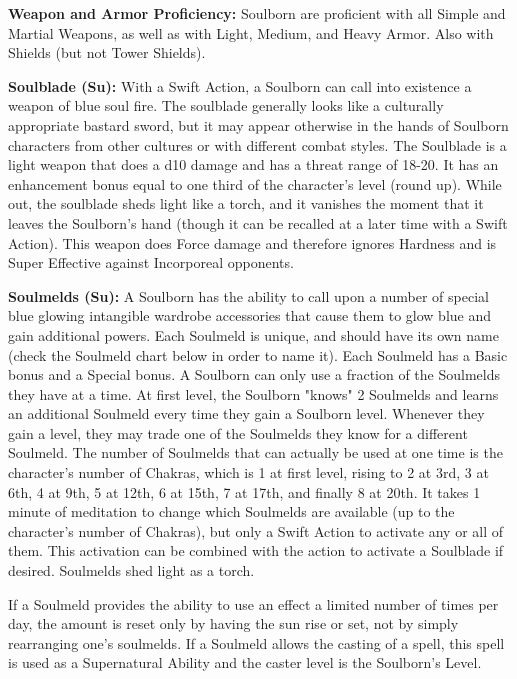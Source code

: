 \classfeatures

\textbf{Weapon and Armor Proficiency:} Soulborn are proficient with all Simple and Martial Weapons, as well as with Light, Medium, and Heavy Armor. Also with Shields (but not Tower Shields). 

\textbf{Soulblade (Su):} With a Swift Action, a Soulborn can call into existence a weapon of blue soul fire. The soulblade generally looks like a culturally appropriate bastard sword, but it may appear otherwise in the hands of Soulborn characters from other cultures or with different combat styles. The Soulblade is a light weapon that does a d10 damage and has a threat range of 18-20. It has an enhancement bonus equal to one third of the character's level (round up). While out, the soulblade sheds light like a torch, and it vanishes the moment that it leaves the Soulborn's hand (though it can be recalled at a later time with a Swift Action). This weapon does Force damage and therefore ignores Hardness and is Super Effective against Incorporeal opponents. 

\textbf{Soulmelds (Su):} A Soulborn has the ability to call upon a number of special blue glowing intangible wardrobe accessories that cause them to glow blue and gain additional powers. Each Soulmeld is unique, and should have its own name (check the Soulmeld chart below in order to name it). Each Soulmeld has a Basic bonus and a Special bonus. A Soulborn can only use a fraction of the Soulmelds they have at a time. At first level, the Soulborn "knows" 2 Soulmelds and learns an additional Soulmeld every time they gain a Soulborn level. Whenever they gain a level, they may trade one of the Soulmelds they know for a different Soulmeld. The number of Soulmelds that can actually be used at one time is the character's number of Chakras, which is 1 at first level, rising to 2 at 3rd, 3 at 6th, 4 at 9th, 5 at 12th, 6 at 15th, 7 at 17th, and finally 8 at 20th. It takes 1 minute of meditation to change which Soulmelds are available (up to the character's number of Chakras), but only a Swift Action to activate any or all of them. This activation can be combined with the action to activate a Soulblade if desired. Soulmelds shed light as a torch. 

If a Soulmeld provides the ability to use an effect a limited number of times per day, the amount is reset only by having the sun rise or set, not by simply rearranging one's soulmelds. If a Soulmeld allows the casting of a spell, this spell is used as a Supernatural Ability and the caster level is the Soulborn's Level. 


